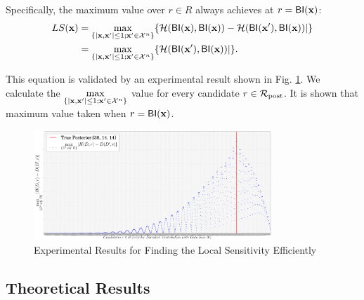 \documentclass{article}
\begin{document}
Specifically, the maximum value over ${r \in R}$ always achieves at $r = \mathsf{BI}(\textbf{x})$:
\begin{equation*}
\begin{split}
LS(\textbf{x}) 
  & = \max\limits_{\{|\textbf{x},\textbf{x}'| \leq 1;\textbf{x}'\in \mathcal{X}^n\}} \{\mathcal{H}(\mathsf{BI}(\textbf{x}), \mathsf{BI}(\textbf{x})) - \mathcal{H}(\mathsf{BI}(\textbf{x}'), \mathsf{BI}(\textbf{x}))|\} \\
  & = \max\limits_{\{|\textbf{x},\textbf{x}'| \leq 1;\textbf{x}'\in \mathcal{X}^n\}} \{\mathcal{H}(\mathsf{BI}(\textbf{x}'), \mathsf{BI}(\textbf{x}))|\}.
\end{split}
\end{equation*}

This equation is validated by an experimental result shown in Fig. \ref{fig_efficiency}. We calculate the $\max\limits_{\{|\textbf{x},\textbf{x}'| \leq 1;\textbf{x}'\in \mathcal{X}^n\}}$ value for every candidate $r \in \mathcal{R}_{\textup{post}}$. It is shown that maximum value taken when  $r = \mathsf{BI}(\textbf{x})$.

\begin{figure}[ht]
\centering
\includegraphics[width=0.8\textwidth]{efficiency}
\caption{Experimental Results for Finding the Local Sensitivity Efficiently}
\label{fig_efficiency}
\end{figure}

\subsection{Theoretical Results}
\end{document}
